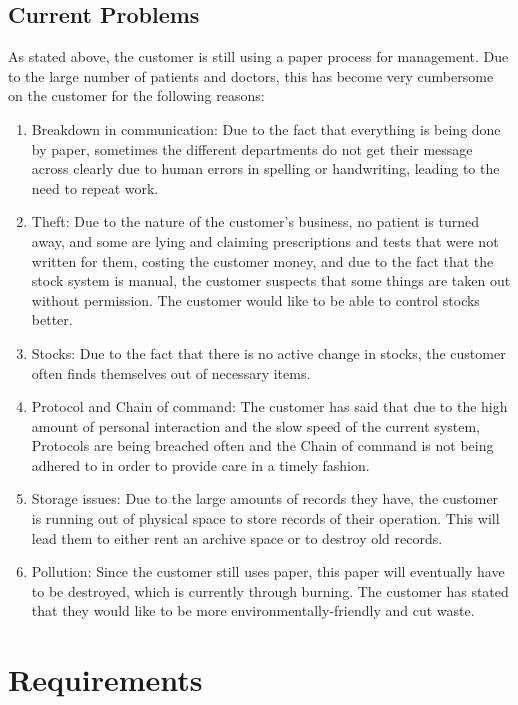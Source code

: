 \documentclass[14pt]{article}
\begin{document}
\subsection{Current Problems}
As stated above, the customer is still using a paper process for management. Due to the large number of patients and doctors, this 
has become very cumbersome on the customer for the following reasons:
\begin{enumerate}

	
	\item Breakdown in communication: Due to the fact that everything is being done by paper, sometimes the different departments
	do not get their message across clearly due to human errors in spelling or handwriting, leading to the need to repeat work.
	
	\item Theft: Due to the nature of the customer's business, no patient is turned away, and some are lying and claiming prescriptions
	and tests that were not written for them, costing the customer money, and due to the fact that the stock system is manual, the customer
	suspects that some things are taken out without permission. The customer would like to be able to control stocks better.
	
	\item Stocks: Due to the fact that there is no active change in stocks, the customer often finds themselves out of necessary items.
	
	\item Protocol and Chain of command: The customer has said that due to the high amount of personal interaction and the slow speed of the 
	current system, Protocols are being breached often and the Chain of command is not being adhered to in order to provide care in a 
	timely fashion. 
	
	\item Storage issues: Due to the large amounts of records they have, the customer is running out of physical space to store 
	records of their operation. This will lead them to either rent an archive space or to destroy old records.
	
	\item Pollution: Since the customer still uses paper, this paper will eventually have to be destroyed, which is currently 
	through burning. The customer has stated that they would like to be more environmentally-friendly and cut waste.
	
	
\end{enumerate}
\newpage
\section{Requirements}
\end{document}
